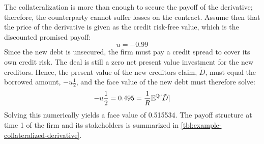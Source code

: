 \documentclass[../main.tex]{subfiles}
\begin{document}
        The collateralization is more than enough to secure the payoff of the derivative;
        therefore, the counterparty cannot suffer losses on the contract.
        Assume then that the price of the derivative is given as the credit risk-free
        value, which is the discounted promised payoff:
            \begin{equation}
                u = \num{-0.99}
            \end{equation}
        Since the new debt is unsecured, 
        the firm must pay a credit spread to cover its own credit risk. 
        The deal is still a zero net present value investment for the new creditors.
        Hence, the present value of the new creditors claim, $\tilde{D}$, 
        must equal the borrowed amount, $-u \frac{1}{2}$,
        and the face value of the new debt must therefore solve:
            \begin{equation}
                -
                u 
                \frac{1}{2} 
                = 
                \num{0.495}
                =
                \frac{1}{R}
                \mathbb{E}^{\mathbb{Q}}[\tilde{D}]
            \end{equation}
        Solving this numerically yields a face value of \num{0.515534}.
        The payoff structure at time 1 of the firm and its stakeholders
        is summarized in \cref{tbl:example-collateralized-derivative}.
\end{document}
